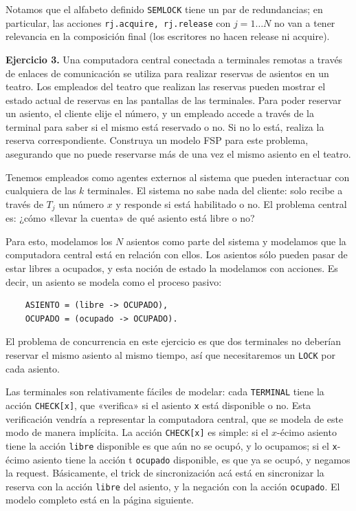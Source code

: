 \documentclass[a4paper, 12pt]{article}
\begin{document}
Notamos que el alfabeto definido \texttt{SEMLOCK} tiene un par de redundancias;
en particular, las acciones \texttt{rj.acquire, rj.release} con $j = 1\ldots N$
no van a tener relevancia en la composición final (los escritores no hacen
release ni acquire).

\pagebreak 

\begin{myframe}
    \textbf{Ejercicio 3.} Una computadora central conectada a terminales remotas a través de enlaces de comunicación se utiliza para realizar reservas de asientos en un teatro. Los empleados del teatro que realizan las reservas pueden mostrar el estado actual de reservas en las pantallas de las terminales. Para poder reservar un asiento, el cliente elije el número, y un empleado accede a través de la terminal para saber si el mismo está reservado o no. Si no lo está, realiza la reserva correspondiente. Construya un modelo FSP para este problema, asegurando que no puede reservarse más de una vez el mismo asiento en el teatro.
\end{myframe}

Tenemos empleados como agentes externos al sistema que pueden interactuar con
cualquiera de las $k$ terminales. El sistema no sabe nada del cliente: solo
recibe a través de $T_j$ un número $x$ y responde si está habilitado o no. El
problema central es: ¿cómo «llevar la cuenta» de qué asiento está libre o no?

Para esto, modelamos los $N$ asientos como parte del sistema y modelamos que la
computadora central está en relación con ellos. Los asientos sólo pueden pasar
de estar libres a ocupados, y esta noción de estado la modelamos con acciones.
Es decir, un asiento se modela como el proceso pasivo:

\begin{verbatim}
    ASIENTO = (libre -> OCUPADO),
    OCUPADO = (ocupado -> OCUPADO).
\end{verbatim}

El problema de concurrencia en este ejercicio es que dos terminales no deberían
reservar el mismo asiento al mismo tiempo, así que necesitaremos un
\texttt{LOCK} por cada asiento. 

Las terminales son relativamente fáciles de modelar: cada \texttt{TERMINAL}
tiene la acción \texttt{CHECK[x]}, que «verifica» si el asiento \texttt{x} está
disponible o no. Esta verificación vendría a representar la computadora central,
que se modela de este modo de manera implícita. La acción \texttt{CHECK[x]} es
simple: si el $x$-écimo asiento tiene la acción \texttt{libre} disponible es que
aún no se ocupó, y lo ocupamos; si el \texttt{x}-écimo asiento tiene la acción t
\texttt{ocupado} disponible, es que ya se ocupó, y negamos la request.
Básicamente, el trick de sincronización acá está en sincronizar la reserva con
la acción \texttt{libre} del asiento, y la negación con la acción
\texttt{ocupado}. El modelo completo está en la página siguiente.
\end{document}
